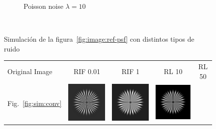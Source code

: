 \documentclass{./packages/optica-article}
\begin{document}
\begin{figure}[hbp]
\begin{center}
\begin{subfigure}[t]{0.25\textwidth}
			\caption{Poisson noise $\lambda =  10$}
		\end{subfigure}
		\hfill\,
		\caption{Simulación de la figura~\ref{fig:image:ref-psf} con distintos tipos de ruido}\label{fig:convolutions}
	\end{center}
\end{figure}


\begin{figure}[hbp]
	\centering
	\begin{tabular}[t]{l c c c c}
		Original Image                                                                  & RIF 0.01 & RIF 1 & RL 10 & RL 50 \\
		Fig.~\ref{fig:sim:conv}                                                         &
		\includegraphics[scale=0.25]{Simulation deconvolution/ref_conv/RIF_0.01.png}    &
		\includegraphics[scale=0.25]{Simulation deconvolution/ref_conv/RIF_1.png}       &
		\includegraphics[scale=0.25]{Simulation deconvolution/ref_conv/RL_10.png}       &

\end{tabular}
\end{figure}
\end{document}
